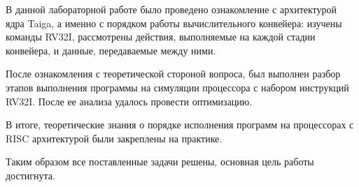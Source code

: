 
В данной лабораторной работе было проведено ознакомление с архитектурой ядра Taiga, а именно с порядком работы вычислительного конвейера: изучены команды RV32I, рассмотрены действия, выполняемые на каждой стадии конвейера, и данные, передаваемые между ними.

После ознакомления с теоретической стороной вопроса, был выполнен разбор этапов выполнения программы на симуляции процессора с набором инструкций RV32I. После ее анализа удалось провести оптимизацию.

В итоге, теоретические знания о порядке исполнения программ на процессорах с RISC архитектурой были закреплены на практике.

Таким образом все поставленные задачи решены, основная цель работы достигнута.